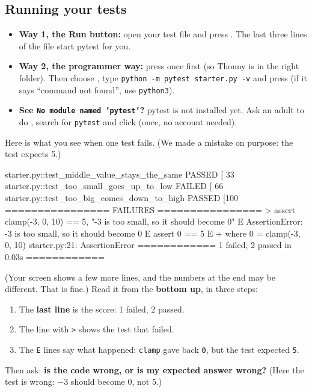 \subsection{Running your tests}
\begin{itemize}[leftmargin=1.2em]
  \item \textbf{Way 1, the Run button:} open your test file and press . The last three lines of the file start pytest for you.
  \item \textbf{Way 2, the programmer way:} press  once first (so Thonny is in the right folder). Then choose
        , type \texttt{python -m pytest starter.py -v} and press 
        (if it says \enquote{command not found}, use \texttt{python3}).
  \item \textbf{See \texttt{No module named 'pytest'}?} pytest is not installed yet. Ask an adult to do
        , search for \texttt{pytest} and click  (once, no account needed).
\end{itemize}
Here is what you see when one test fails. (We made a mistake on purpose: the test expects 5.)
\begin{outputcode}
starter.py::test_middle_value_stays_the_same PASSED     [ 33%
starter.py::test_too_small_goes_up_to_low FAILED        [ 66%
starter.py::test_too_big_comes_down_to_high PASSED      [100%
================ FAILURES ================
>       assert clamp(-3, 0, 10) == 5, "-3 is too small, so it should become 0"
E       AssertionError: -3 is too small, so it should become 0
E       assert 0 == 5
E        +  where 0 = clamp(-3, 0, 10)
starter.py:21: AssertionError
============ 1 failed, 2 passed in 0.03s ============
\end{outputcode}
(Your screen shows a few more lines, and the numbers at the end may be different. That is fine.)
Read it from the \textbf{bottom up}, in three steps:
\begin{enumerate}[leftmargin=1.4em,itemsep=0pt]
  \item The \textbf{last line} is the score: 1 failed, 2 passed.
  \item The line with \texttt{>} shows the test that failed.
  \item The \texttt{E} lines say what happened: \texttt{clamp} gave back \texttt{0}, but the test expected \texttt{5}.
\end{enumerate}
Then ask: \textbf{is the code wrong, or is my expected answer wrong?}
(Here the test is wrong: $-3$ should become 0, not 5.)

